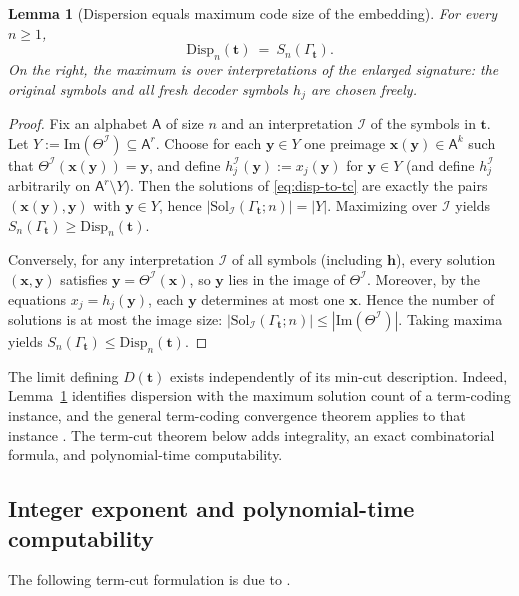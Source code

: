 \documentclass[11pt]{article}
\newcommand{\textcite}[1]{\citet{#1}}
\newcommand{\parencite}[1]{\citep{#1}}
\theoremstyle{definition}
\theoremstyle{plain}
\newtheorem{lemma}[definition]{Lemma}
\newcommand{\A}{\mathsf{A}}
\newcommand{\Sol}{\mathrm{Sol}}
\newcommand{\Img}{\mathrm{Im}}
\newcommand{\Disp}{\mathrm{Disp}}
\newcommand{\Sn}{S_n}
\begin{document}
\begin{lemma}[Dispersion equals maximum code size of the embedding]
\label{lem:disp-embed}
For every $n\ge 1$,
\[
\Disp_n(\mathbf t)\ =\ \Sn(\Gamma_{\mathbf t}).
\]
On the right, the maximum is over interpretations of the enlarged signature: the original symbols and all
fresh decoder symbols $h_j$ are chosen freely.
\end{lemma}

\begin{proof}
Fix an alphabet $\A$ of size $n$ and an interpretation $\mathcal I$ of the symbols in $\mathbf t$.
Let $Y:=\Img(\Theta^\mathcal I)\subseteq \A^r$.
Choose for each $\mathbf y\in Y$ one preimage $\mathbf x(\mathbf y)\in \A^k$ such that
$\Theta^\mathcal I(\mathbf x(\mathbf y))=\mathbf y$, and define $h_j^\mathcal I(\mathbf y):=x_j(\mathbf y)$
for $\mathbf y\in Y$ (and define $h_j^\mathcal I$ arbitrarily on $\A^r\setminus Y$).
Then the solutions of \eqref{eq:disp-to-tc} are exactly the pairs
$(\mathbf x(\mathbf y),\mathbf y)$ with $\mathbf y\in Y$, hence $|\Sol_\mathcal I(\Gamma_{\mathbf t};n)|=|Y|$.
Maximizing over $\mathcal I$ yields $\Sn(\Gamma_{\mathbf t})\ge \Disp_n(\mathbf t)$.

Conversely, for any interpretation $\mathcal I$ of all symbols (including $\mathbf h$), every solution
$(\mathbf x,\mathbf y)$ satisfies $\mathbf y=\Theta^\mathcal I(\mathbf x)$, so $\mathbf y$ lies in the image
of $\Theta^\mathcal I$.  Moreover, by the equations $x_j=h_j(\mathbf y)$, each $\mathbf y$ determines at most
one $\mathbf x$.  Hence the number of solutions is at most the image size:
$|\Sol_\mathcal I(\Gamma_{\mathbf t};n)|\le |\Img(\Theta^\mathcal I)|$.
Taking maxima yields $\Sn(\Gamma_{\mathbf t})\le \Disp_n(\mathbf t)$.
\end{proof}

The limit defining $D(\mathbf t)$ exists independently of its min-cut description.  Indeed,
Lemma~\ref{lem:disp-embed} identifies dispersion with the maximum solution count of a term-coding instance,
and the general term-coding convergence theorem applies to that instance
\parencite{riis2026termcoding}.  The term-cut theorem below adds integrality, an exact combinatorial formula,
and polynomial-time computability.

\subsection{Integer exponent and polynomial-time computability}
The following term-cut formulation is due to \textcite{riis2019max}.
\end{document}
